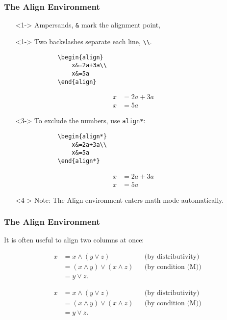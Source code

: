 \begin{frame}[fragile]
\frametitle{The Align Environment}
\begin{itemize}
	\item[]<1-> Ampersands, \verb|&| mark the alignment point,
	\item[]<1-> Two backslashes separate each line, \verb|\\|.
	\pause
	 \begin{multicols}{2}
	 	\begin{verbatim}
			\begin{align}
				x&=2a+3a\\
				x&=5a
			\end{align}
		\end{verbatim}
	\columnbreak
		\begin{align}
			x&=2a+3a\\
			x&=5a
		\end{align}
	\end{multicols}
	\item[]<3-> To exclude the numbers, use \verb|align*|:
	 \begin{multicols}{2}
	 	\begin{verbatim}
			\begin{align*}
				x&=2a+3a\\
				x&=5a
			\end{align*}
		\end{verbatim}
	\columnbreak
		\begin{align*}
			x&=2a+3a\\
			x&=5a
		\end{align*}
	\end{multicols}
	\item[]<4-> Note: The Align environment enters math mode automatically.
\end{itemize}
\end{frame}

\begin{frame}[fragile]
\frametitle{The Align Environment}

It is often useful to align two columns at once:

	\begin{align*} 
		x&=x \wedge (y \vee z) &&\text{(by distributivity)} \\ 
		&= (x \wedge y) \vee (x \wedge z) && \text{(by condition (M))}\\ 
		&= y \vee z.
	\end{align*}

\pause
\begin{verbatimtab}
	\begin{align*} 
	   x&=x \wedge (y \vee z) &&\text{(by distributivity)} \\ 
	   &= (x \wedge y) \vee (x \wedge z) 
	      && \text{(by condition (M))}\\ 
	   &= y \vee z.
	\end{align*}
\end{verbatimtab}
\end{frame}

